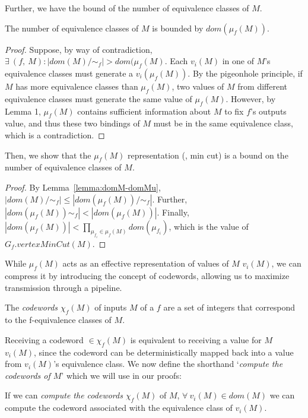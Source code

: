 Further, we have the bound of the number of equivalence classes of $M$.

\begin{lemma} The number of equivalence classes of $M$ is bounded by $dom(\mu_f(M))$.
\label{lemma:domM-domMu}
\end{lemma}

\begin{proof}
Suppose, by way of contradiction, $\exists\ (f,\ M) : |dom(M)/\sim_f| > dom(\mu_f(M)$. Each $v_i(M)$ in one of $M$'s equivalence classes must generate a $v_i(\mu_f(M))$. By the pigeonhole principle, if $M$ has more equivalence classes than $\mu_f(M)$, two values of $M$ from different equivalence classes must generate the same value of $\mu_f(M)$. However, by Lemma 1, $\mu_f(M)$ contains sufficient information about $M$ to fix $f$'s outputs value, and thus these two bindings of $M$ must be in the same equivalence class, which is a contradiction.
\end{proof}


Then, we show that the $\mu_f(M)$ representation (\ie, min cut) is a bound on the number of equivalence classes of $M$.

\begin{proof}
By Lemma~\ref{lemma:domM-domMu}, $|dom(M)/\sim_f| \leq |dom(\mu_f(M))/\sim_f|$. Further, $|dom(\mu_f(M))\sim_f| < |dom(\mu_f(M))|$. Finally, $|dom(\mu_f(M))| < \prod_{\mu_{f_i} \in \mu_f(M)} dom(\mu_{f_i})$, which is the value of $G_f.vertexMinCut(M)$.
\end{proof}

While $\mu_f(M)$ acts as an effective representation of values of $M$ $v_i(M)$, we can compress it by introducing the concept of codewords, allowing us to maximize transmission through a pipeline.

\begin{definition} The {\em codewords $\chi_f(M)$} of inputs $M$ of a $f$ are a set of integers that correspond to the f-equivalence classes of $M$.
\end{definition}

Receiving a codeword $\in \chi_f(M)$ is equivalent to receiving a value for $M$ $v_i(M)$, since the codeword can be deterministically mapped back into a value from $v_i(M)$'s equivalence class. We now define the shorthand `\textit{compute the codewords of $M$}' which we will use in our proofs:

\begin{definition} If we can {\em compute the codewords $\chi_f(M)$} of $M$, $\forall\ v_i(M) \in dom(M)$ we can compute the codeword associated with the equivalence class of $v_i(M)$.
\end{definition}

